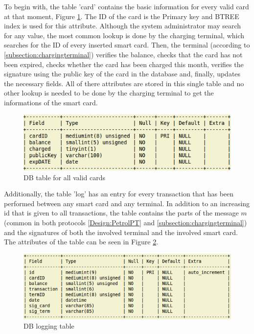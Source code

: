 \documentclass[a4paper,10pt]{llncs}
\begin{document}
To begin with, the table 'card' contains the basic information for every valid card at that moment, Figure \ref{figure:dbtable_card}. 
The ID of the card is the Primary key and BTREE index is used for this attribute. Although the system administrator may search 
for any value, the most common lookup is done by the charging terminal, which searches for the ID of every inserted smart card. Then, 
the terminal (according to \ref{subsection:chargingterminal}) verifies the balance, checks that the card has not been expired, 
checks whether the card has been charged this month, verifies the signature using the public key of the card in the database and, finally, 
updates the necessary fields. All of there attributes are stored in this single table and no other lookup is needed to be 
done by the charging terminal to get the informations of the smart card.
    \begin{figure}
    	\centering
    	\includegraphics[scale=0.38]{img/dbtable_card.png}
    	\caption{\label{figure:dbtable_card}DB table for all valid cards}
    \end{figure}
    
Additionally, the table 'log' has an entry for every transaction that has been performed between any smart card and any terminal. In addition to an increasing id that is given to all transactions, the table contains the parts of the message $m$ (common in both protocols \ref{Design:PetrolPT} and \ref{subsection:chargingterminal}) and the signatures of both the involved terminal and the involved smart card. The attributes of the table can be seen in Figure \ref{figure:dbtable_log}. 
    \begin{figure}
    	\centering
    	\includegraphics[scale=0.38]{img/dbtable_log.png}
    	\caption{\label{figure:dbtable_log}DB logging table}
    \end{figure}
    
\end{document}
